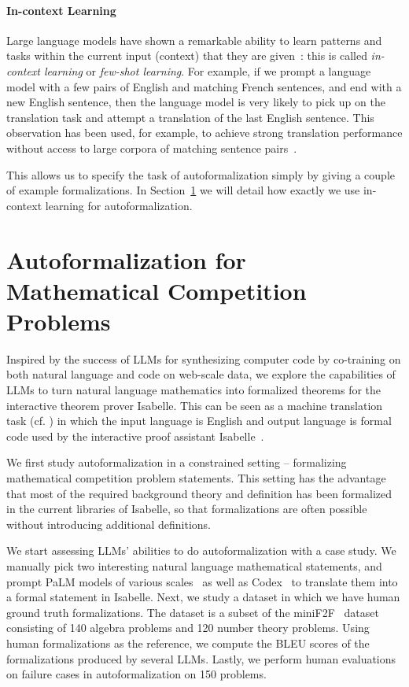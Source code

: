 \documentclass{article}
\begin{document}
\paragraph{In-context Learning}
Large language models have shown a remarkable ability to learn patterns and tasks within the current input (context) that they are given~\citep{brown2020gpt3}: this is called \emph{in-context learning} or \emph{few-shot learning}.
For example, if we prompt a language model with a few pairs of English and matching French sentences, and end with a new English sentence, then the language model is very likely to pick up on the translation task and attempt a translation of the last English sentence.
This observation has been used, for example, to achieve strong translation performance without access to large corpora of matching sentence pairs~\citep{han2021fewshotunsupervised}.


This allows us to specify the task of autoformalization simply by giving a couple of example formalizations.
In Section~\ref{sec:exp} we will detail how exactly we use in-context learning for autoformalization.
 



\section{Autoformalization for Mathematical Competition Problems}
\label{sec:exp}



Inspired by the success of LLMs for synthesizing computer code by co-training on both natural language and code on web-scale data, we explore the capabilities of LLMs to turn natural language mathematics into formalized theorems for the interactive theorem prover Isabelle. This can be seen as a machine translation task (cf. \cite{Wang2020autoformalization}) in which the input language is English and output language is formal code used by the interactive proof assistant Isabelle~\citep{wenzel08isabelle}.

We first study autoformalization in a constrained setting -- formalizing mathematical competition problem statements. This setting has the advantage that most of the required background theory and definition has been formalized in the current libraries of Isabelle, so that formalizations are often possible without introducing additional definitions.

We start assessing LLMs' abilities to do autoformalization with a case study. We manually pick two interesting natural language mathematical statements, and prompt PaLM models of various scales~\citep{chowdhery2022palm} as well as Codex~\citep{chen2021codex} to translate them into a formal statement in Isabelle.
Next, we study a dataset in which we have human ground truth formalizations. The dataset is a subset of the miniF2F~\citep{hendrycks2021math} dataset consisting of 140 algebra problems and 120 number theory problems. Using human formalizations as the reference, we compute the BLEU scores of the formalizations produced by several LLMs.
Lastly, we perform human evaluations on failure cases in autoformalization on 150 problems. 
\end{document}
